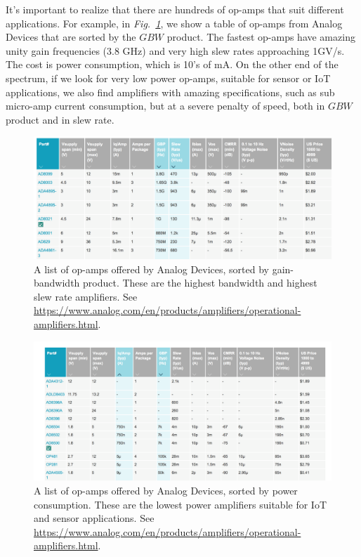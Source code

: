 It's important to realize that there are hundreds of op-amps that suit different applications.  For example, in \emph{Fig.~\ref{fig:opamp_table.png}}, we show a table of op-amps from Analog Devices that are sorted by the $GBW$ product.  The fastest op-amps have amazing unity gain frequencies (3.8 GHz) and very high slew rates approaching 1GV/s.  The cost is power consumption, which is 10's of mA.  On the other end of the spectrum, if we look for very low power op-amps, suitable for sensor or IoT applications, we also find amplifiers with amazing specifications, such as sub micro-amp current consumption, but at a severe penalty of speed, both in $GBW$ product and in slew rate.  
\begin{figure}[tb]
\centering
\includegraphics[width=\columnwidth]{opamp_table.png}
\caption{A list of op-amps offered by Analog Devices, sorted by gain-bandwidth product.  These are the highest bandwidth and highest slew rate amplifiers.  See \url{https://www.analog.com/en/products/amplifiers/operational-amplifiers.html}.} \label{fig:opamp_table.png}
\end{figure}
\begin{figure}[tb]
\centering
\includegraphics[width=\columnwidth]{opamp_lowpower.png}
\caption{A list of op-amps offered by Analog Devices, sorted by power consumption.  These are the lowest power amplifiers suitable for IoT and sensor applications.  See \url{https://www.analog.com/en/products/amplifiers/operational-amplifiers.html}.} \label{fig:opamp_lowpower.png}
\end{figure}
